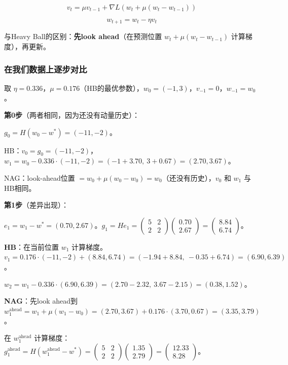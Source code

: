 \documentclass[12pt,a4paper]{article}
\begin{document}
\[v_t = \mu v_{t-1} + \nabla L(w_t + \mu(w_t - w_{t-1}))\]

\[w_{t+1} = w_t - \eta v_t\]

与Heavy Ball的区别：\textbf{先look ahead}（在预测位置 $w_t + \mu(w_t - w_{t-1})$ 计算梯度），再更新。


\subsubsection{在我们数据上逐步对比}

取 $\eta = 0.336$，$\mu = 0.176$（HB的最优参数），$w_0 = (-1, 3)$，$v_{-1} = 0$，$w_{-1} = w_0$。

\textbf{第0步}（两者相同，因为还没有动量历史）：

$g_0 = H(w_0 - w^*) = (-11, -2)$。

HB：$v_0 = g_0 = (-11, -2)$，$w_1 = w_0 - 0.336 \cdot (-11,-2) = (-1+3.70,\ 3+0.67) = (2.70, 3.67)$。

NAG：look-ahead位置 $= w_0 + \mu(w_0 - w_0) = w_0$（还没有历史），$v_0$ 和 $w_1$ 与HB相同。

\textbf{第1步}（差异出现）：

$e_1 = w_1 - w^* = (0.70, 2.67)$。$g_1 = He_1 = \begin{pmatrix}5&2\\2&2\end{pmatrix}\begin{pmatrix}0.70\\2.67\end{pmatrix} = \begin{pmatrix}8.84\\6.74\end{pmatrix}$。

\textbf{HB}：在当前位置 $w_1$ 计算梯度。$v_1 = 0.176 \cdot (-11,-2) + (8.84, 6.74) = (-1.94 + 8.84,\ -0.35 + 6.74) = (6.90, 6.39)$。

$w_2 = w_1 - 0.336 \cdot (6.90, 6.39) = (2.70 - 2.32,\ 3.67 - 2.15) = (0.38, 1.52)$。

\textbf{NAG}：先look ahead到 $w_1^{\text{ahead}} = w_1 + \mu(w_1 - w_0) = (2.70, 3.67) + 0.176 \cdot (3.70, 0.67) = (3.35, 3.79)$。

在 $w_1^{\text{ahead}}$ 计算梯度：$g_1^{\text{ahead}} = H(w_1^{\text{ahead}} - w^*) = \begin{pmatrix}5&2\\2&2\end{pmatrix}\begin{pmatrix}1.35\\2.79\end{pmatrix} = \begin{pmatrix}12.33\\8.28\end{pmatrix}$。
\end{document}
